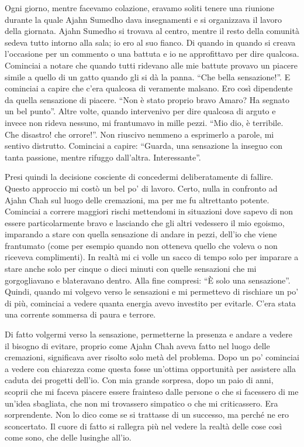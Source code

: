 Ogni giorno, mentre facevamo colazione, eravamo soliti tenere una riunione durante la quale Ajahn Sumedho dava insegnamenti e si organizzava il lavoro della giornata. Ajahn Sumedho si trovava al centro, mentre il resto della comunità sedeva tutto intorno alla sala; io ero al suo fianco. Di quando in quando si creava l'occasione per un commento o una battuta e io ne approfittavo per dire qualcosa. Cominciai a notare che quando tutti ridevano alle mie battute provavo un piacere simile a quello di un gatto quando gli si dà la panna. ``Che bella sensazione!''. E cominciai a capire che c'era qualcosa di veramente malsano. Ero così dipendente da quella sensazione di piacere. ``Non è stato proprio bravo Amaro? Ha segnato un bel punto''. Altre volte, quando intervenivo per dire qualcosa di arguto e invece non rideva nessuno, mi frantumavo in mille pezzi. ``Mio dio, è terribile. Che disastro! che orrore!''. Non riuscivo nemmeno a esprimerlo a parole, mi sentivo distrutto. Cominciai a capire: ``Guarda, una sensazione la inseguo con tanta passione, mentre rifuggo dall'altra. Interessante''.

Presi quindi la decisione cosciente di concedermi deliberatamente di fallire. Questo approccio mi costò un bel po' di lavoro. Certo, nulla in confronto ad Ajahn Chah sul luogo delle cremazioni, ma per me fu altrettanto potente. Cominciai a correre maggiori rischi mettendomi in situazioni dove sapevo di non essere particolarmente bravo e lasciando che gli altri vedessero il mio egoismo, imparando a stare con quella sensazione di andare in pezzi, dell'io che viene frantumato (come per esempio quando non otteneva quello che voleva o non riceveva complimenti). In realtà mi ci volle un sacco di tempo solo per imparare a stare anche solo per cinque o dieci minuti con quelle sensazioni che mi gorgogliavano e blateravano dentro. Alla fine compresi: ``È solo una sensazione''. Quindi, quando mi volgevo verso le sensazioni e mi permettevo di rischiare un po' di più, cominciai a vedere quanta energia avevo investito per evitarle. C'era stata una corrente sommersa di paura e terrore.

Di fatto volgermi verso la sensazione, permetterne la presenza e andare a vedere il bisogno di evitare, proprio come Ajahn Chah aveva fatto nel luogo delle cremazioni, significava aver risolto solo metà del problema. Dopo un po' cominciai a vedere con chiarezza come questa fosse un'ottima opportunità per assistere alla caduta dei progetti dell'io. Con mia grande sorpresa, dopo un paio di anni, scoprii che mi faceva piacere essere frainteso dalle persone o che si facessero di me un'idea sbagliata, che non mi trovassero simpatico o che mi criticassero. Era sorprendente. Non lo dico come se si trattasse di un successo, ma perché ne ero sconcertato. Il cuore di fatto si rallegra più nel vedere la realtà delle cose così come sono, che delle lusinghe all'io.

